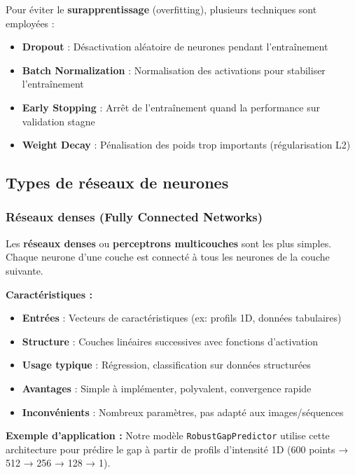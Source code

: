 \documentclass[11pt,a4paper,twocolumn]{article}
\begin{document}
Pour éviter le \textbf{surapprentissage} (overfitting), plusieurs techniques sont employées :

\begin{itemize}
    \item \textbf{Dropout} : Désactivation aléatoire de neurones pendant l'entraînement
    \item \textbf{Batch Normalization} : Normalisation des activations pour stabiliser l'entraînement
    \item \textbf{Early Stopping} : Arrêt de l'entraînement quand la performance sur validation stagne
    \item \textbf{Weight Decay} : Pénalisation des poids trop importants (régularisation L2)
\end{itemize}

\subsection{Types de réseaux de neurones}

\subsubsection{Réseaux denses (Fully Connected Networks)}

Les \textbf{réseaux denses} ou \textbf{perceptrons multicouches} sont les plus simples. Chaque neurone d'une couche est connecté à tous les neurones de la couche suivante.

\textbf{Caractéristiques :}
\begin{itemize}
    \item \textbf{Entrées} : Vecteurs de caractéristiques (ex: profils 1D, données tabulaires)
    \item \textbf{Structure} : Couches linéaires successives avec fonctions d'activation
    \item \textbf{Usage typique} : Régression, classification sur données structurées
    \item \textbf{Avantages} : Simple à implémenter, polyvalent, convergence rapide
    \item \textbf{Inconvénients} : Nombreux paramètres, pas adapté aux images/séquences
\end{itemize}

\textbf{Exemple d'application :} Notre modèle \texttt{RobustGapPredictor} utilise cette architecture pour prédire le gap à partir de profils d'intensité 1D (600 points → 512 → 256 → 128 → 1).
\end{document}
